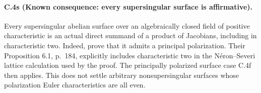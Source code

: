 \paragraph{C.4s (Known consequence: every supersingular surface is affirmative).}
Every supersingular abelian surface over an algebraically closed
field of positive characteristic is an actual direct summand of
a product of Jacobians, including in characteristic two.
Indeed, \citet[Lemma 6.2, p.~185]{frC4FuLi2021} prove that it
admits a principal polarization. Their Proposition 6.1,
p.~184, explicitly includes characteristic two in the
N\'eron--Severi lattice calculation used by the proof.
The principally polarized surface case C.4f then applies.
This does not settle arbitrary nonsupersingular surfaces whose
polarization Euler characteristics are all even.
